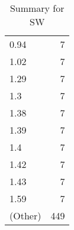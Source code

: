 \begin{table}[ht]
\begin{tabular}{lr}
  0.94 &   7 \\ 
  1.02 &   7 \\ 
  1.29 &   7 \\ 
  1.3 &   7 \\ 
  1.38 &   7 \\ 
  1.39 &   7 \\ 
  1.4 &   7 \\ 
  1.42 &   7 \\ 
  1.43 &   7 \\ 
  1.59 &   7 \\ 
  (Other) & 449 \\ 
   \hline
\end{tabular}
\caption{Summary for SW} 
\label{tab: SW}
\end{table}
